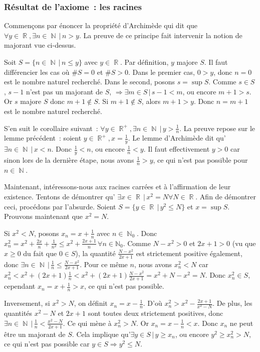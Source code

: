 \documentclass{article}
\DeclareMathOperator{\R}{\mathbb R}
\DeclareMathOperator{\N}{\mathbb N}
\theoremstyle{definition}
\theoremstyle{remark}
\begin{document}
		\subsubsection{Résultat de l'axiome~: les racines}
			Commençons par énoncer la propriété d'Archimède qui dit que $\forall y\in \R, \exists n \in \N \, | \, n > y$.
			La preuve de ce principe fait intervenir la notion de majorant vue ci-dessus.

			Soit $S = \{n \in \N \, | \, n \leq y\}$ avec $y \in \R$. Par définition, $y$ majore $S$. Il faut différencier les cas où
			$\#S = 0$ et $\#S > 0$. Dans le premier cas, $0 > y$, donc $n = 0$ est le nombre naturel recherché. Dans le second, posons $s = \sup S$.
			Comme $s \in S$, $s - 1$ n'est pas un majorant de $S$, $\Rightarrow \exists m \in S \, | \, s - 1 < m$, ou encore $m + 1 > s$. Or $s$
			majore $S$ donc $m + 1 \not \in S$. Si $m + 1 \not \in S$, alors $m+1 > y$. Donc $n = m + 1$ est le nombre naturel recherché.

			S'en suit le corollaire suivant~: $\forall y \in \R^+, \exists n \in \N \, | \, y > \frac 1n$. La preuve repose sur le lemme
			précédent~: soient $y \in \R^+, x = \frac 1y$. Le lemme d'Archimède dit qu'$\exists n \in \N \, | \, x < n$. Donc
			$\frac 1y < n$, ou encore $\frac 1n < y$. Il faut effectivement $y > 0$ car sinon lors de la dernière étape, nous avons $\frac 1n > y$,
			ce qui n'est pas possible pour $n \in \N$.

			Maintenant, intéressons-nous aux racines carrées et à l'affirmation de leur existence. Tentons de démontrer qu'
			$\exists x \in \R \, | \, x^2 = N \forall N \in \R$. Afin de démontrer ceci, procédons par l'absurde. Soient
			$S = \{y \in \R \, | \, y^2 \leq N\}$ et $x = \sup S$. Prouvons maintenant que $x^2 = N$.

			Si $x^2 < N$, posons $x_n = x + \frac 1n$ avec $n \in \N_0$. Donc
			$x_n^2 = x^2 + \frac {2x}{n} + \frac {1}{n^2} \leq x^2 + \frac {2x+1}{n} \, \forall n \in \mathbb N_0$. Comme $N - x^2 > 0$ et $2x + 1 > 0$ (vu
			que $x \geq 0$ du fait que $0 \in S$), la quantité $\frac {N - x^2}{2x + 1}$ est strictement positive également, donc
			$\exists n \in \N \, | \, \frac 1n \leq \frac {N - x^2}{2x + 1}$. Pour ce même $n$, nous avons $x_n^2 < N$ car
			$x_n^2 < x^2 + (2x+1)\frac 1n < x^2 + (2x+1)\frac {N - x^2}{2x + 1} = x^2 + N - x^2 = N$. Donc $x_n^2 \in S$, cependant $x_n = x + \frac 1n > x$,
			ce qui n'est pas possible.

			Inversement, si $x^2 > N$, on définit $x_n = x - \frac 1n$. D'où $x_n^2 >x^2 - \frac {2x+1}{x^2 - N}$. De plus, les quantités $x^2 - N$
			et $2x + 1$ sont toutes deux strictement positives, donc $\exists n \in \N \, | \, \frac 1n < \frac {x^2 - N}{2x + 1}$. Ce qui
			mène à $x_n^2 > N$. Or $x_n = x - \frac 1n < x$. Donc $x_n$ ne peut être un majorant de $S$. Cela implique qu'$\exists y \in S \, | \, y \geq x_n$,
			ou encore $y^2 \geq x_n^2 > N$, ce qui n'est pas possible car $y \in S \Rightarrow y^2 \leq N$.
\end{document}
